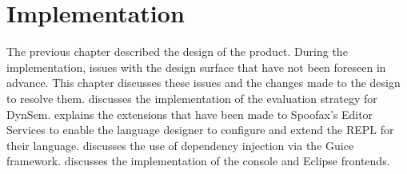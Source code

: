 \chapter{Implementation}
\label{cha:implementation}

The previous chapter described the design of the product. During the
implementation, issues with the design surface that have not been foreseen in
advance. This chapter discusses these issues and the changes made to the design
to resolve them.  discusses the implementation
of the evaluation strategy for DynSem.  explains the
extensions that have been made to Spoofax's Editor Services to enable the
language designer to configure and extend the REPL for their
language.  discusses the use of dependency injection via the
Guice framework.   discusses the implementation of the
console and Eclipse frontends.







